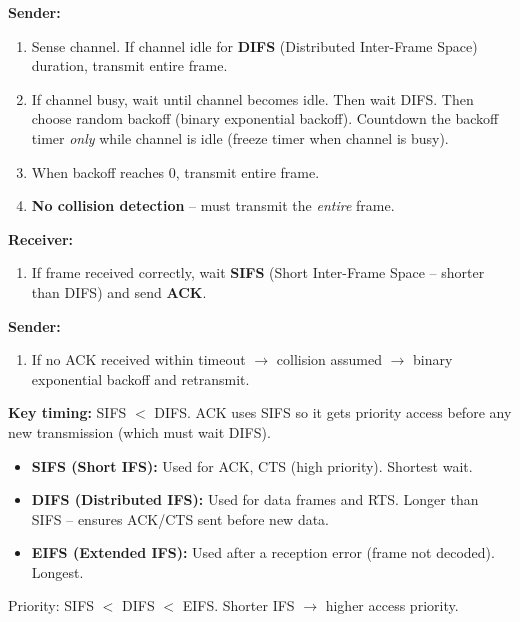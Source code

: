\begin{keybox}
\textbf{Sender:}
\begin{enumerate}[noitemsep]
    \item Sense channel. If channel idle for \textbf{DIFS} (Distributed Inter-Frame Space) duration, transmit entire frame.
    \item If channel busy, wait until channel becomes idle. Then wait DIFS. Then choose random backoff (binary exponential backoff). Countdown the backoff timer \emph{only} while channel is idle (freeze timer when channel is busy).
    \item When backoff reaches 0, transmit entire frame.
    \item \textbf{No collision detection} -- must transmit the \emph{entire} frame.
\end{enumerate}

\medskip
\textbf{Receiver:}
\begin{enumerate}[noitemsep]
    \item If frame received correctly, wait \textbf{SIFS} (Short Inter-Frame Space -- shorter than DIFS) and send \textbf{ACK}.
\end{enumerate}

\medskip
\textbf{Sender:}
\begin{enumerate}
    \item If no ACK received within timeout $\rightarrow$ collision assumed $\rightarrow$ binary exponential backoff and retransmit.
\end{enumerate}

\medskip
\textbf{Key timing:} SIFS $<$ DIFS. ACK uses SIFS so it gets priority access before any new transmission (which must wait DIFS).
\end{keybox}

\begin{formulabox}
\begin{itemize}[noitemsep]
    \item \textbf{SIFS (Short IFS):} Used for ACK, CTS (high priority). Shortest wait.
    \item \textbf{DIFS (Distributed IFS):} Used for data frames and RTS. Longer than SIFS -- ensures ACK/CTS sent before new data.
    \item \textbf{EIFS (Extended IFS):} Used after a reception error (frame not decoded). Longest.
\end{itemize}
Priority: SIFS $<$ DIFS $<$ EIFS. Shorter IFS $\rightarrow$ higher access priority.
\end{formulabox}

